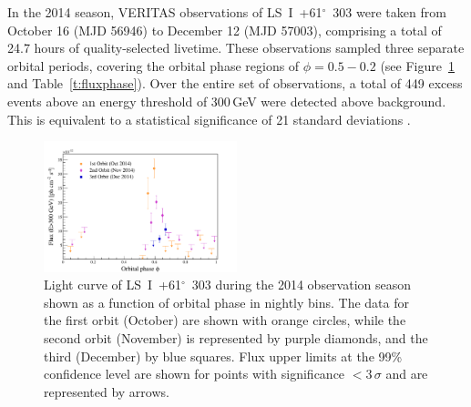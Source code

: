 \documentclass[preprint2]{aastex}
\newcommand{\lsi}{LS~I~+61$^{\circ}$~303}
\newcommand{\gev}{\,GeV}
\begin{document}
In the 2014 season, VERITAS observations of \lsi{} were taken from October 16 (MJD 56946) to  December 12 (MJD 57003), comprising a total of 24.7 hours of quality-selected livetime. These observations sampled three separate orbital periods, covering the orbital phase regions of $\phi = 0.5-0.2$ (see Figure~\ref{f:fluxphase} and Table~\ref{t:fluxphase}). Over the entire set of observations, a total of 449 excess events above an energy threshold of 300\gev{} were detected above background. This is equivalent to a statistical significance of 21 standard deviations \citep[$21\sigma$, calculated using Equation 17 of][]{LiMa}.

\begin{figure}[ht]
\centering
\includegraphics[width=0.5\textwidth]{./figs/fluxvphase_300.pdf}
\caption{Light curve of \lsi{} during the 2014 observation season shown as a function of orbital phase in nightly bins. %
The data for the first orbit (October) are shown with orange circles, while the second orbit (November) is represented by purple diamonds, and the third (December) by blue squares. Flux upper limits at the 99\% confidence level \citep[using the unbounded approach of][]{Rolke} are shown for points with significance $<3\,\sigma$ and are represented by arrows.
}
\label{f:fluxphase}
\end{figure}
\end{document}
